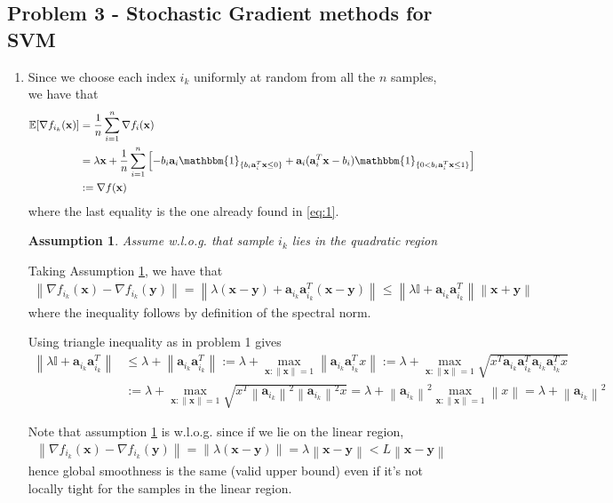 \documentclass[letterpaper]{article}
\renewcommand{\aa}{\mathbf{a}}
\providecommand{\xx}{\mathbf{x}}
\providecommand{\yy}{\mathbf{y}}
\providecommand{\1}{\mathbf{1}}
\providecommand{\0}{\mathbf{0}}
\providecommand{\norm}[1]{\ensuremath{\left\lVert#1\right\rVert}}
\newtheorem{assumption}{Assumption}
\newcommand{\E}{\mathbb{E}}
\begin{document}
\subsection*{Problem 3 - Stochastic Gradient methods for SVM}
\begin{enumerate}[label=(\alph*)]
    \item
    Since we choose each index $i_k$ uniformly at random from all the $n$ samples, we have that
    \begin{align}
        \E[\nabla f_{i_k}(\xx)] &= \frac{1}{n} \sum_{i=1}^{n} \nabla f_i(\xx) \\
        &= \lambda \xx + \frac{1}{n}\sum_{i=1}^n \left[ -b_i \aa_i\mathbbm{1}_{\{b_i \aa_i^T \xx  \leq 0\}} + \aa _i(\aa_i^T \xx - b_i )\mathbbm{1}_{\{0<b_i \aa_i^T \xx\leq 1\}} \right] \\
        &:= \nabla f(\xx)
    \end{align}
    where the last equality is the one already found in \eqref{eq:1}.
    
    \begin{assumption}
        Assume w.l.o.g. that sample $i_k$ lies in the quadratic region
        \label{as:1}
    \end{assumption}
    
    Taking Assumption \ref{as:1}, we have that
    \begin{align}
        \norm{\nabla f_{i_k}(\xx) - \nabla f_{i_k}(\yy)} = \norm{\lambda(\xx - \yy) + \aa_{i_k} \aa_{i_k}^T (\xx - \yy)} \leq \norm{\lambda\mathbb{I} + \aa_{i_k} \aa_{i_k}^T}\norm{\xx + \yy}
    \end{align}
    where the inequality follows by definition of the spectral norm.
    
    Using triangle inequality as in problem 1 gives
    \begin{align}
        \norm{\lambda\mathbb{I} + \aa_{i_k} \aa_{i_k}^T} &\leq \lambda + \norm{\aa_{i_k} \aa_{i_k}^T} := \lambda + \max_{\xx:\norm{\xx}=1} \norm{\aa_{i_k} \aa_{i_k}^T x} := \lambda + \max_{\xx:\norm{\xx}=1} \sqrt{x^T \aa_{i_k} \aa_{i_k} ^T \aa_{i_k} \aa_{i_k}^T x} \\
        &:=\lambda + \max_{\xx:\norm{\xx}=1} \sqrt{x^T \norm{\aa_{i_k}} ^2 \norm{\aa_{i_k}} ^2 x} = \lambda + \norm{\aa_{i_k}} ^2 \max_{\xx:\norm{\xx}=1} \norm{x} = \lambda + \norm{\aa_{i_k}} ^2
    \end{align}
    
    Note that assumption \ref{as:1} is w.l.o.g. since if we lie on the linear region,
    \begin{align}
        \norm{\nabla f_{i_k}(\xx) - \nabla f_{i_k}(\yy)} = \norm{\lambda(\xx - \yy)} = \lambda \norm{\xx-\yy} < L\norm{\xx-\yy}
    \end{align}
    hence global smoothness is the same (valid upper bound) even if it's not locally tight for the samples in the linear region.
    

\end{enumerate}
\end{document}
